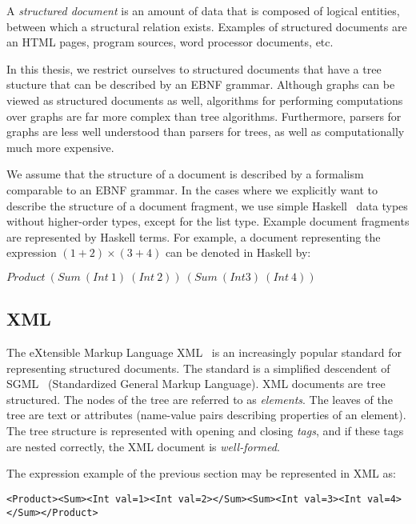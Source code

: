 
A {\em structured document} is an amount of data that is composed of logical entities, between which a structural relation exists. Examples of structured documents are an HTML pages, program sources, word processor documents, etc. 

In this thesis, we restrict ourselves to structured documents that have a tree stucture that can be described by an EBNF grammar. Although graphs can be viewed as structured documents as well, algorithms for performing computations over graphs are far more complex than tree algorithms. Furthermore, parsers for graphs are less well understood than parsers for trees, as well as computationally much more expensive. 

We assume that the structure of a document is described by a formalism comparable to an EBNF grammar. In the cases where we explicitly want to describe the structure of a document fragment, we use simple Haskell~\cite{peytonJones03haskell} data types without higher-order types, except for the list type. Example document fragments are represented by Haskell terms. For example, a document representing the expression  $(1+2) \times (3 + 4)$ can be denoted in Haskell by: 

$Product~(Sum~(Int~1)~(Int~2))~(Sum~(Int 3)~(Int~4))$

\subsection{XML}


The eXtensible Markup Language XML~\cite{xml11} is an increasingly popular standard for representing structured documents. The standard is a simplified descendent of SGML~\cite{sgml86} (Standardized General Markup Language). XML documents are tree structured. The nodes of the tree are referred to as {\em elements}. The leaves of the tree are text or attributes (name-value pairs describing properties of an element). The tree structure is represented with opening and closing {\em tags}, and if these tags are nested correctly, the XML document is {\em well-formed}.

The expression example of the previous section may be represented in XML as:

\begin{scriptsize}
\verb|<Product><Sum><Int val=1><Int val=2></Sum><Sum><Int val=3><Int val=4></Sum></Product>|
\end{scriptsize}

